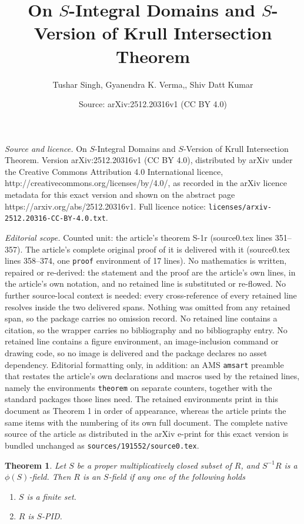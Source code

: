 \documentclass[10pt,a4paper]{amsart}
\title{On $S$-Integral Domains and $S$-Version of Krull Intersection Theorem}
\author{Tushar Singh, Gyanendra K. Verma,, Shiv Datt Kumar}
\date{Source: arXiv:2512.20316v1 (CC BY 4.0)}
\newtheorem{theorem}{Theorem}
\begin{document}
\maketitle

\noindent\emph{Source and licence.} On $S$-Integral Domains and $S$-Version of Krull Intersection Theorem. Version arXiv:2512.20316v1 (CC BY 4.0), distributed by arXiv under the Creative Commons Attribution 4.0 International licence, http://creativecommons.org/licenses/by/4.0/, as recorded in the arXiv licence metadata for this exact version and shown on the abstract page https://arxiv.org/abs/2512.20316v1. Full licence notice: \texttt{licenses/arxiv-2512.20316-CC-BY-4.0.txt}.\par\smallskip

\noindent\textit{Editorial scope.} Counted unit: the article's theorem S-1r (source0.tex lines 351--357). The article's complete original proof of it is delivered with it (source0.tex lines 358--374, one \texttt{proof} environment of 17 lines). No mathematics is written, repaired or re-derived: the statement and the proof are the article's own lines, in the article's own notation, and no retained line is substituted or re-flowed.  No further source-local context is needed: every cross-reference of every retained line resolves inside the two delivered spans.  Nothing was omitted from any retained span, so the package carries no omission record.  No retained line contains a citation, so the wrapper carries no bibliography and no bibliography entry.  No retained line contains a figure environment, an image-inclusion command or drawing code, so no image is delivered and the package declares no asset dependency.  Editorial formatting only, in addition: an AMS \texttt{amsart} preamble that restates the article's own declarations and macros used by the retained lines, namely the environments \texttt{theorem} on separate counters, together with the standard packages those lines need.  The retained environments print in this document as Theorem 1 in order of appearance, whereas the article prints the same items with the numbering of its own full document.  The complete native source of the article as distributed in the arXiv e-print for this exact version is bundled unchanged as \texttt{sources/191552/source0.tex}.
	\begin{theorem}\label{S-1r}
		Let $S$ be a proper multiplicatively closed subset of $R$, and $S^{-1}R$ is a $\phi(S)$-field. Then $R$ is an $S$-field if any one of the following holds
		\begin{enumerate}
			\item $S$ is a finite set.
			\item $R$ is $S$-PID.
		\end{enumerate}
	\end{theorem}
\end{document}
